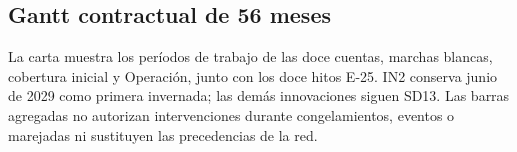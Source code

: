 \subsection{Gantt contractual de 56 meses} %
La carta muestra los períodos de trabajo de las doce cuentas, marchas blancas, cobertura inicial y Operación, junto con los doce hitos E-25. IN2 conserva junio de 2029 como primera invernada; las demás innovaciones siguen SD13. Las barras agregadas no autorizan intervenciones durante congelamientos, eventos o marejadas ni sustituyen las precedencias de la red.~\parencite[art.~17, pp.~12--13; Formulario E-25, p.~74]{bases-admin}


